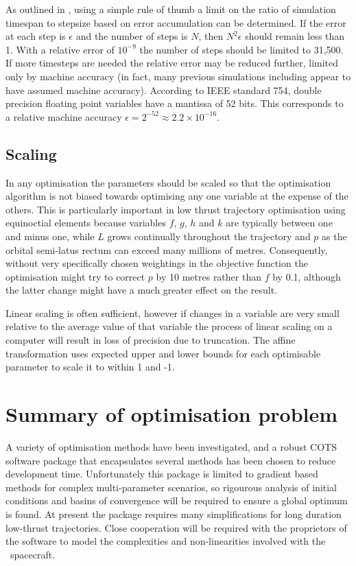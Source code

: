 As outlined in \textcite{Milani1987}, using a simple rule of thumb a limit on the ratio of simulation timespan to stepsize based on error accumulation can be determined. If the error at each step is $\epsilon$ and the number of steps is $N$, then $N^{2}\epsilon$ should remain less than 1. With a relative error of $10^{-9}$ the number of steps should be limited to 31,500. If more timesteps are needed the relative error may be reduced further, limited only by machine accuracy (in fact, many previous simulations including \citeauthor{Milani1987} appear to have assumed machine accuracy). According to IEEE standard 754, double precision floating point variables have a mantissa of 52 bits. This corresponds to a relative machine accuracy $\epsilon=2^{-52}\approx2.2\times10^{-16}$.

\subsection{Scaling} \label{sub:Scaling}

In any optimisation the parameters should be scaled so that the optimisation algorithm is not biased towards optimising any one variable at the expense of the others. This is particularly important in low thrust trajectory optimisation using equinoctial elements because variables $f$, $g$, $h$ and $k$ are typically between one and minus one, while $L$ grows continually throughout the trajectory and $p$ as the orbital semi-latus rectum can exceed many millions of metres. Consequently, without very specifically chosen weightings in the objective function the optimisation might try to correct $p$ by 10 metres rather than $f$ by 0.1, although the latter change might have a much greater effect on the result.

Linear scaling is often sufficient, however if changes in a variable are very small relative to the average value of that variable the process of linear scaling on a computer will result in loss of precision due to truncation. The affine transformation \parencite{ASTOS_guide} uses expected upper and lower bounds for each optimisable parameter to scale it to within 1 and -1.

\section{Summary of optimisation problem} \label{sec:Optimisation-Summary}

A variety of optimisation methods have been investigated, and a robust COTS software package that encapsulates several methods has been chosen to reduce development time. Unfortunately this package is limited to gradient based methods for complex multi-parameter scenarios, so rigourous analysis of initial conditions and basins of convergence will be required to ensure a global optimum is found. At present the package requires many simplifications for long duration low-thrust trajectories. Close cooperation will be required with the proprietors of the software to model the complexities and non-linearities involved with the \BW\ spacecraft.
 
\clearpage